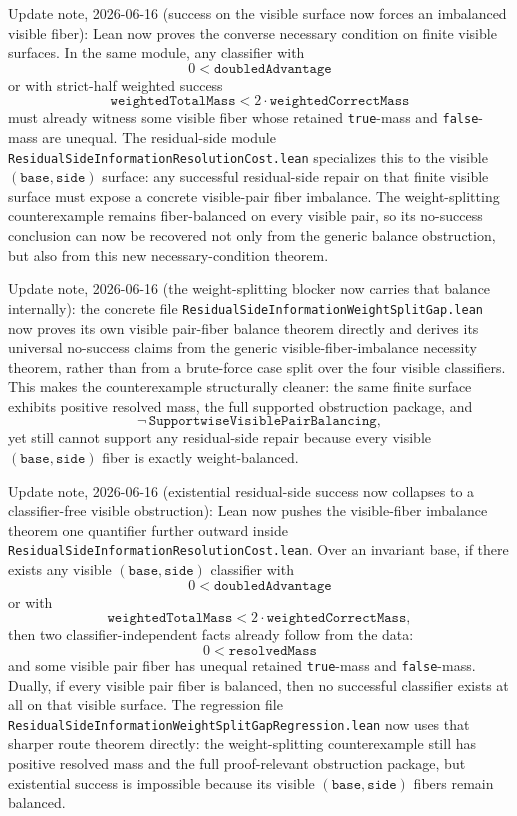 \documentclass[11pt]{article}
\theoremstyle{remark}
\begin{document}
Update note, 2026-06-16 (success on the visible surface now forces an
imbalanced visible fiber): Lean now proves the converse necessary condition on
finite visible surfaces.  In the same module, any classifier with
\[
0 < \texttt{doubledAdvantage}
\]
or with strict-half weighted success
\[
\texttt{weightedTotalMass} < 2 \cdot \texttt{weightedCorrectMass}
\]
must already witness some visible fiber whose retained \texttt{true}-mass and
\texttt{false}-mass are unequal.  The residual-side module
\texttt{ResidualSideInformationResolutionCost.lean} specializes this to the
visible \((\texttt{base},\texttt{side})\) surface: any successful
residual-side repair on that finite visible surface must expose a concrete
visible-pair fiber imbalance.  The weight-splitting counterexample remains
fiber-balanced on every visible pair, so its no-success conclusion can now be
recovered not only from the generic balance obstruction, but also from this
new necessary-condition theorem.

Update note, 2026-06-16 (the weight-splitting blocker now carries that balance
internally): the concrete file
\texttt{ResidualSideInformationWeightSplitGap.lean} now proves its own visible
pair-fiber balance theorem directly and derives its universal no-success
claims from the generic visible-fiber-imbalance necessity theorem, rather than
from a brute-force case split over the four visible classifiers.  This makes
the counterexample structurally cleaner: the same finite surface exhibits
positive resolved mass, the full supported obstruction package, and
\[
\neg\,\texttt{SupportwiseVisiblePairBalancing},
\]
yet still cannot support any residual-side repair because every visible
\((\texttt{base},\texttt{side})\) fiber is exactly weight-balanced.

Update note, 2026-06-16 (existential residual-side success now collapses to a
classifier-free visible obstruction): Lean now pushes the visible-fiber
imbalance theorem one quantifier further outward inside
\texttt{ResidualSideInformationResolutionCost.lean}.  Over an invariant base,
if there exists any visible \((\texttt{base},\texttt{side})\) classifier with
\[
0 < \texttt{doubledAdvantage}
\]
or with
\[
\texttt{weightedTotalMass} < 2 \cdot \texttt{weightedCorrectMass},
\]
then two classifier-independent facts already follow from the data:
\[
0 < \texttt{resolvedMass}
\]
and some visible pair fiber has unequal retained \texttt{true}-mass and
\texttt{false}-mass.  Dually, if every visible pair fiber is balanced, then no
successful classifier exists at all on that visible surface.  The regression
file \texttt{ResidualSideInformationWeightSplitGapRegression.lean} now uses
that sharper route theorem directly: the weight-splitting counterexample still
has positive resolved mass and the full proof-relevant obstruction package,
but existential success is impossible because its visible \((\texttt{base},
\texttt{side})\) fibers remain balanced.
\end{document}
